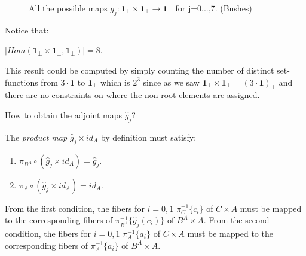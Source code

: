 \begin{figure}[h]
	\caption{All the possible maps $g_j : \textbf{1}_\bot \times \textbf{1}_\bot \rightarrow \textbf{1}_\bot$ for j=0,..,7. 	(Bushes)}
\end{figure}

Notice that:
\begin{lem}
	$|Hom(\textbf{1}_\bot \times \textbf{1}_\bot, \textbf{1}_\bot)|=8$.
\end{lem}
  This result could be computed by simply counting the number of distinct set-functions from $3\cdot \textbf{1}$ to $\textbf{1}_\bot$ which is $2^3$ since as we saw $\textbf{1}_\bot \times \textbf{1}_\bot = (3\cdot \textbf{1})_\bot$ and there are no constraints on where the non-root elements are assigned. \newline

How to obtain the adjoint maps $\hat{g}_j$?\newline

The \emph{product map} $\hat{g}_j \times id_A$ by definition must satisfy:
\begin{enumerate}
	\item $\pi_{B^A}\circ(\hat{g}_j \times id_A) = \hat{g}_j$.
	\item $\pi_{A}\circ(\hat{g}_j \times id_A) = id_A$.
\end{enumerate}
From the first condition, the fibers for $i=0,1$ $\pi_C^{-1}\{c_i\}$ of $C \times A$ must be mapped to the corresponding fibers of $\pi_{B^A}^{-1}\{\hat{g}_j(c_i)\}$ of $B^A \times A$. \newline
From the second condition, the fibers for $i=0,1$ $\pi_A^{-1}\{a_i\}$ of $C \times A$ must be mapped to the corresponding fibers of $\pi_A^{-1}\{a_i\}$ of $B^A \times A$. \newline

